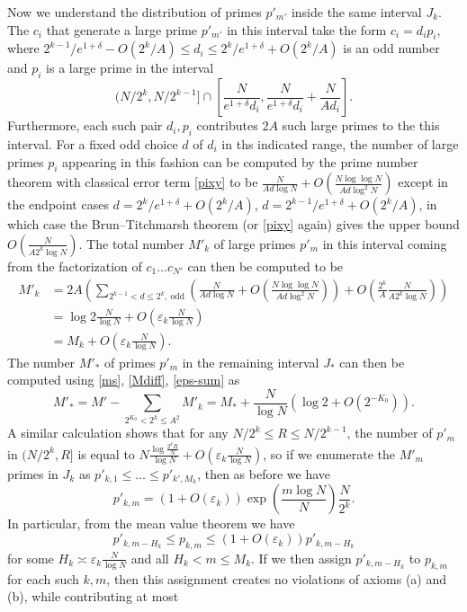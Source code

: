 \documentclass[12pt,a4paper,reqno]{amsart}
\numberwithin{equation}{section}
\theoremstyle{plain}
\theoremstyle{definition}
\newcommand\eps{\varepsilon}
\begin{document}
Now we understand the distribution of primes $p'_{m'}$ inside the same interval $J_k$.  The $c_i$ that generate a large prime $p'_{m'}$ in this interval take the form $c_i = d_i p_i$, where $2^{k-1}/e^{1+\delta} - O(2^k/A) \leq d_i \leq 2^k/e^{1+\delta} + O(2^k/A)$ is an odd number and $p_i$ is a large prime in the interval
$$ (N/2^k, N/2^{k-1}] \cap \left[\frac{N}{e^{1+\delta} d_i}, \frac{N}{e^{1+\delta} d_i} + \frac{N}{A d_i}\right].$$
Furthermore, each such pair $d_i,p_i$ contributes $2A$ such large primes to the this interval.  For a fixed odd choice $d$ of $d_i$ in ths indicated range, the number of large primes $p_i$ appearing in this fashion can be computed by the prime number theorem with classical error term \eqref{pixy} to be $\frac{N}{A d \log N} + O( \frac{N \log\log N}{Ad \log^2 N})$ except in the endpoint cases $d = 2^k/e^{1+\delta} + O(2^k/A)$, $d = 2^{k-1}/e^{1+\delta} + O(2^k/A)$, in which case the Brun--Titchmarsh theorem (or \eqref{pixy} again) gives the upper bound $O(\frac{N}{A 2^k \log N})$.  The total number $M'_k$ of large primes $p'_m$ in this interval coming from the factorization of $c_1 \dots c_{N'}$ can then be computed to be
\begin{align*}
  M'_k &= 2A \left(\sum_{2^{k-1} < d \leq 2^k,\ \mathrm{odd}} \left(\frac{N}{A d \log N} + O\left( \frac{N \log\log N}{Ad \log^2 N}\right)\right) + O\left( \frac{2^k}{A} \frac{N}{A 2^k \log N} \right)\right) \\
&= \log 2 \frac{N}{\log N} + O\left( \eps_k \frac{N}{\log N} \right) \\
&= M_k + O\left( \eps_k \frac{N}{\log N} \right).
\end{align*}
The number $M'_*$ of primes $p'_m$ in the remaining interval $J_*$ can then be computed using \eqref{ms}, \eqref{Mdiff}, \eqref{eps-sum} as
\begin{equation}\label{msp}
  M'_* = M' - \sum_{2^{K_0} < 2^k \leq A^2} M'_k = M_* + \frac{N}{\log N} (\log 2 + O(2^{-K_0}) ).
 \end{equation}
 A similar calculation shows that for any $N/2^k \leq R \leq N/2^{k-1}$, the number of $p'_m$ in $(N/2^k, R]$ is equal to
 $N\frac{\log \frac{2^k R}{N}}{\log N} + O( \eps_k \frac{N}{\log N} )$, so if we enumerate the $M'_m$ primes in $J_k$ as $p'_{k,1} \leq \dots \leq p'_{k',M_k}$, then as before we have
$$ p'_{k,m} = (1 + O(\eps_k)) \exp\left( \frac{m \log N}{N} \right) \frac{N}{2^k}.$$
In particular, from the mean value theorem we have
$$ p'_{k,m-H_k} \leq p_{k,m} \leq (1 + O(\eps_k)) p'_{k,m-H_k}$$
for some $H_k \asymp \eps_k \frac{N}{\log N}$ and all $H_k < m \leq M_k$.  If we then assign $p'_{k,m-H_k}$ to $p_{k,m}$ for each such $k,m$, then this assignment creates no violations of axioms (a) and (b), while contributing at most
\end{document}
